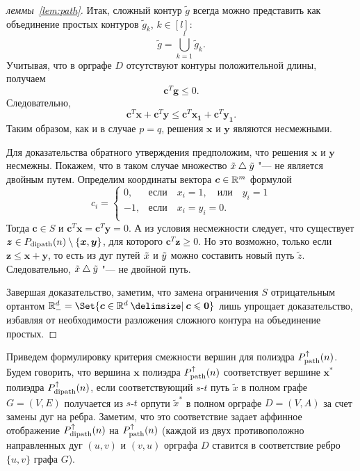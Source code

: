 \begin{proof}[леммы~\ref{lem:path}]
Итак, сложный контур $\tilde g$ всегда можно представить как объединение простых контуров $\tilde g_k$, $k \in[l]$:
\[
\tilde g=\bigcup_{k=1}^l \tilde g_k.
\]
Учитывая, что в орграфе $D$ отсутствуют контуры положительной длины, получаем
\[
\bm{c}^T \bm{g} \le 0.
\]
Следовательно,
\[
\bm{c}^T \bm{x} + \bm{c}^T \bm{y} \le \bm{c}^T \bm{x_1} + \bm{c}^T \bm{y_1}.
\]
Таким образом, как и в случае $p = q$, решения $\bm{x}$ и $\bm{y}$ являются несмежными.

Для доказательства обратного утверждения предположим, что решения $\bm{x}$ и $\bm{y}$ несмежны. Покажем, что в таком случае множество 
$\tilde x \bigtriangleup \tilde y$ "--- не является двойным путем.
Определим координаты вектора $\bm{c} \in \mathbb{R}^m$ формулой
\[
c_i=\left\{
\begin{array}{ll}
0,      &\mbox{если} \quad x_i=1, \quad \mbox{или} \quad y_i=1\\
-1,      &\mbox{если} \quad x_i=y_i=0.\\
\end{array}
\right.
\]
Тогда $\bm{c}\in S$ и $\bm{c}^T \bm{x} = \bm{c}^T \bm{y} = 0$.
А из условия несмежности следует, что существует $\bm{z} \in P_{\textup{dipath}}(n) \setminus \{\bm{x},\bm{y}\}$, для которого $\bm{c}^T \bm{z} \ge 0$.
Но это возможно, только если $\bm{z} \le \bm{x} + \bm{y}$, то есть из дуг путей $\tilde x$ и $\tilde y$ можно составить новый путь $\tilde z$. Следовательно, $\tilde x \bigtriangleup \tilde y$ "--- не двойной путь.

Завершая доказательство, заметим, что замена ограничения $S$ отрицательным ортантом $\R^d_- = \Set{\bm{c} \in \R^d \given \bm{c} \le \bm{0}}$ лишь упрощает доказательство, избавляя от необходимости разложения сложного контура на объединение простых.
\end{proof}

Приведем формулировку критерия смежности вершин для полиэдра $P_{\textup{path}}^{\uparrow}(n)$. Будем говорить, что вершина $\bm{x}$ полиэдра $P_{\textup{path}}^{\uparrow}(n)$ соответствует вершине $\bm{x^*}$ полиэдра $P_{\textup{dipath}}^{\uparrow}(n)$,
если соответствующий $s$-$t$ путь $\tilde{x}$ в полном графе $G=(V,E)$ получается из $s$-$t$ орпути $\tilde{x}^*$ в полном орграфе $D=(V,A)$ за счет замены дуг на ребра.
Заметим, что это соответствие задает аффинное отображение $P_{\textup{dipath}}^{\uparrow}(n)$ на $P_{\textup{path}}^{\uparrow}(n)$ (каждой из двух противоположно направленных дуг $(u,v)$ и $(v,u)$ орграфа $D$ ставится в соответствие ребро $\{u,v\}$ графа $G$).

